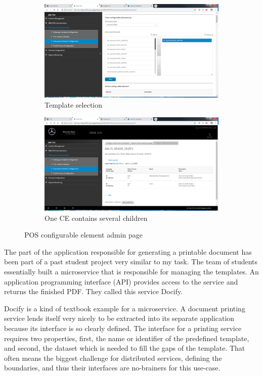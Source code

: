 \begin{figure}
  \begin{subfigure}[b]{0.5\linewidth}
    \includegraphics[width=\linewidth]{assets/pos-ce-config-1.png}
    \caption{Template selection}
    \label{fig:pos:a}
  \end{subfigure}
  \begin{subfigure}[b]{0.5\linewidth}
    \includegraphics[width=\linewidth]{assets/pos-ce-config-3.png}
    \caption{One CE contains several children}
    \label{fig:pos:b}
  \end{subfigure}
  \caption{POS configurable element admin page}
  \label{fig:pos}
\end{figure}

The part of the application responsible for generating a printable document has been part of a past student project very similar to my task. The team of students essentially built a microservice that is responsible for managing the templates. An application programming interface (API) provides access to the service and returns the finished PDF. They called this service Docify.

Docify is a kind of textbook example for a microservice. A document printing service lends itself very nicely to be extracted into its separate application because its interface is so clearly defined. The interface for a printing service requires two properties, first, the name or identifier of the predefined template, and second, the dataset which is needed to fill the gaps of the template. That often means the biggest challenge for distributed services, defining the boundaries, and thus their interfaces are no-brainers for this use-case.

